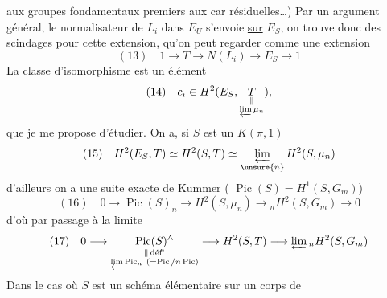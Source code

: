 aux groupes fondamentaux premiers aux car résiduelles\dots) Par un argument général, le normalisateur de $L_i$ dans $E_U$ s'envoie \uline{sur} $E_S$, on trouve donc des scindages pour cette extension, qu'on peut regarder comme une extension
\[
(13)\quad 1\longrightarrow T\longrightarrow N(L_i)\longrightarrow E_S\longrightarrow1
\]
La classe d'isomorphisme est un élément 
\[
(14)\quad c_i\in H^2(E_S,\underset{\substack{\Vert\\\varprojlim\mu_n}}{T}),
\]
que je me propose d'étudier. On a, si $S$ est un $K(\pi,1)$
\[
(15)\quad H^2(E_S,T)\simeq H^2(S,T)\simeq\varprojlim_{\unsure{n}} H^2(S,\mu_n)
\]
d'ailleurs on a une suite exacte de Kummer ( $\operatorname{Pic}(S)=H^1(S,G_m)$)
\[
(16)\quad 0\longrightarrow\operatorname{Pic}(S)_n\longrightarrow H^2(S,\mu_n)\longrightarrow {}_nH^2(S,G_m)\longrightarrow0
\]
d'où par passage à la limite
\[
(17)\quad 0\longrightarrow
\underset{\substack{\Vert\,\text{déf}\!^{\mathrm n}\\\varprojlim\operatorname{Pic}_n\ (=\operatorname{Pic}/n\operatorname{Pic})}}{\operatorname{Pic}(S)^\wedge}
\longrightarrow H^2(S,T)\longrightarrow\varprojlim {}_nH^2(S,G_m)
\]
Dans le cas où $S$ est un schéma élémentaire sur un corps de  
